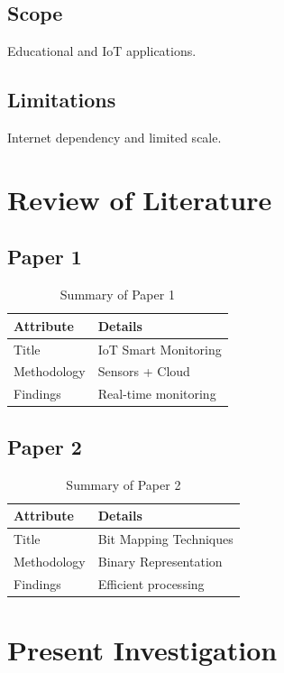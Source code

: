 \documentclass[12pt,a4paper,twoside]{report}
\begin{document}
	\section{Scope}
	Educational and IoT applications.
	
	\section{Limitations}
	Internet dependency and limited scale.
	
	\chapter{Review of Literature}
	
	\section{Paper 1}
	\begin{table}[H]
		\centering
		\begin{tabular}{|p{4cm}|p{9cm}|}
			\hline
			Attribute & Details \\
			\hline
			Title & IoT Smart Monitoring \\
			Methodology & Sensors + Cloud \\
			Findings & Real-time monitoring \\
			\hline
		\end{tabular}
		\caption{Summary of Paper 1}
	\end{table}
	
	\section{Paper 2}
	\begin{table}[H]
		\centering
		\begin{tabular}{|p{4cm}|p{9cm}|}
			\hline
			Attribute & Details \\
			\hline
			Title & Bit Mapping Techniques \\
			Methodology & Binary Representation \\
			Findings & Efficient processing \\
			\hline
		\end{tabular}
		\caption{Summary of Paper 2}
	\end{table}
	
	\chapter{Present Investigation}
	
\end{document}
